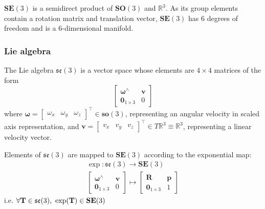 		$\textbf{SE}(3)$ is a semidirect product of $\textbf{SO}(3)$ and $ \mathbb{R}^3$. As its group elements contain a rotation matrix and translation vector, $\textbf{SE}(3)$ has 6 degrees of freedom and is a 6-dimensional manifold.
			
		\subsubsection{Lie algebra}
		The Lie algebra $\mathfrak{se}(3)$ is a vector space whose elements are $4 \times 4$ matrices of the form
		\begin{equation}
			\begin{bmatrix}
				  \bm{\omega}^{\wedge}	&  \mathbf{v}\\
				  \textbf{0}_{1 \times 3} & 0						  
			\end{bmatrix}
		\end{equation}
		where $\bm{\omega} =
		\begin{bmatrix}
			\omega_x & \omega_y & \omega_z				
		\end{bmatrix}
		^\top \in \mathbf{so}(3)$, representing an angular velocity in scaled axis representation, and
		$\mathbf{v} = 
		\begin{bmatrix}
			v_x & v_y & v_z				
		\end{bmatrix}
		^\top \in T\mathbb{R}^3 \equiv \mathbb{R}^3$, representing a linear velocity vector.
		
		Elements of $\mathfrak{se}(3)$ are mapped to $\textbf{SE}(3)$ according to the exponential map:
			\begin{equation}
				\begin{split}
					\exp: \mathfrak{se}(3) \rightarrow \mathbf{SE}(3)\\
					\begin{bmatrix}
						  \bm{\omega}^{\wedge}	&  \mathbf{v}\\
						  \textbf{0}_{1 \times 3} & 0						  
					\end{bmatrix}
					\mapsto 
					\begin{bmatrix}
						  \mathbf{R}	&	\mathbf{p} \\
						  \textbf{0}_{1 \times 3}		& 	1 
					\end{bmatrix}
				\end{split}		
			\end{equation}		
			i.e. $\forall \mathbf{T} \in \mathfrak{se}(3) \textnormal{, } \exp(\mathbf{T}) \in  \mathbf{SE}(3)$
			
